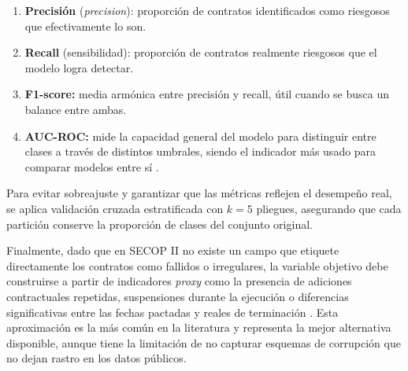 \begin{enumerate}
    \item \textbf{Precisión} (\textit{precision}): proporción de contratos identificados como riesgosos que efectivamente lo son.
    \item \textbf{Recall} (sensibilidad): proporción de contratos realmente riesgosos que el modelo logra detectar.
    \item \textbf{F1-score:} media armónica entre precisión y recall, útil cuando se busca un balance entre ambas.
    \item \textbf{AUC-ROC:} mide la capacidad general del modelo para distinguir entre clases a través de distintos umbrales, siendo el indicador más usado para comparar modelos entre sí \cite{salazar2024vigia}.
\end{enumerate}

Para evitar sobreajuste y garantizar que las métricas reflejen el desempeño real, se aplica validación cruzada estratificada con $k = 5$ pliegues, asegurando que cada partición conserve la proporción de clases del conjunto original.

Finalmente, dado que en SECOP II no existe un campo que etiquete directamente los contratos como fallidos o irregulares, la variable objetivo debe construirse a partir de indicadores \textit{proxy} como la presencia de adiciones contractuales repetidas, suspensiones durante la ejecución o diferencias significativas entre las fechas pactadas y reales de terminación \cite{gomez2025data, dulce2021deteccion}. Esta aproximación es la más común en la literatura y representa la mejor alternativa disponible, aunque tiene la limitación de no capturar esquemas de corrupción que no dejan rastro en los datos públicos.